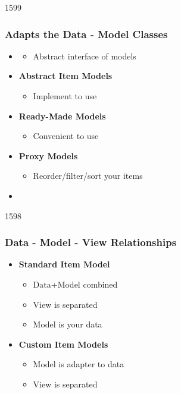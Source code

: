 \begin{slide}{1599}\frametitle{Adapts the Data - Model Classes}
  \begin{itemize}
  \item \textbf{}
    \begin{itemize}
    \item Abstract interface of models
   \end{itemize}
  \item \textbf{Abstract Item Models}
    \begin{itemize}
    \item Implement to use
 \end{itemize}
  \item \textbf{Ready-Made Models}
    \begin{itemize}
    \item Convenient to use
  \end{itemize}
 \item \textbf{Proxy Models}
   \begin{itemize}
   \item Reorder/filter/sort your items
  \end{itemize}
   \item[] 
 \end{itemize}
\end{slide}

\begin{slide}{1598}
  \frametitle{Data - Model - View Relationships}
  \begin{itemize}
 \item \textbf{Standard Item Model}
    \begin{itemize}
    \item Data+Model combined
    \item View is separated
    \item Model is your data
    \end{itemize}
 \end{itemize}
 \begin{itemize}
 \item \textbf{Custom Item Models}
    \begin{itemize}
    \item Model is adapter to data
    \item View is separated
    \end{itemize}
 \end{itemize}
\end{slide}



